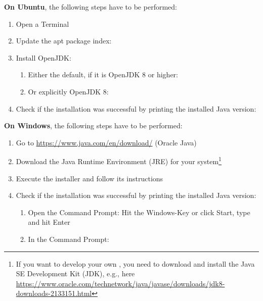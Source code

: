\textbf{On Ubuntu}, the following steps have to be performed:
\begin{enumerate}
	\item Open a Terminal
	\item Update the apt package index: 
	\item Install OpenJDK:
	\begin{enumerate}
		\item Either the default, if it is OpenJDK 8 or higher: 
		\item Or explicitly OpenJDK 8: 
	\end{enumerate}
	\item Check if the installation was successful by printing the installed Java version: 
\end{enumerate}

\textbf{On Windows}, the following steps have to be performed:
\begin{enumerate}
	\item Go to \url{https://www.java.com/en/download/} (Oracle Java)
	\item Download the Java Runtime Environment (JRE) for your system\footnote{If you want to develop your own , you need to download and install the Java SE Development Kit (JDK), e.g., here \url{https://www.oracle.com/technetwork/java/javase/downloads/jdk8-downloads-2133151.html}}
	\item Execute the installer and follow its instructions
	\item Check if the installation was successful by printing the installed Java version:
	\begin{enumerate}
		\item Open the Command Prompt: Hit the Windows-Key or click Start, type  and hit Enter
		\item In the Command Prompt: 
	\end{enumerate}
\end{enumerate}
